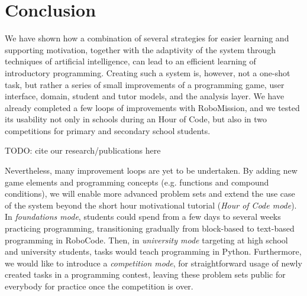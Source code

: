 \chapter{Conclusion}
\label{chap:conclusion}


We have shown how a combination of several strategies for easier learning and
supporting motivation, together with the adaptivity of the system
through techniques of artificial intelligence,
can lead to an efficient learning of introductory programming. %
Creating such a system is, however, not a one-shot task, but rather a series
of small improvements of a programming game, user interface,
domain, student and tutor models, and the analysis layer.
We have already completed a few loops of improvements with
RoboMission,
and we tested its usability not only in schools during an Hour of Code,
but also in two competitions for primary and secondary school students. %

TODO: cite our research/publications here



Nevertheless, many improvement loops are yet to be undertaken. By adding
new game elements and programming concepts (e.g. functions and compound
conditions), we will enable more advanced problem sets and extend the use
case of the system beyond the short hour motivational tutorial (\emph{Hour of Code mode}).  %
In \emph{foundations mode}, students could spend from a few days to several weeks practicing
programming, transitioning gradually from block-based to text-based programming
in RoboCode.
Then, in \emph{university mode} targeting at high school and university students,
tasks would teach programming in Python.
Furthermore, we would like to introduce a \emph{competition mode}, for
straightforward usage of newly created tasks in a programming contest,
leaving these problem sets public for everybody for practice once the
competition is over.

